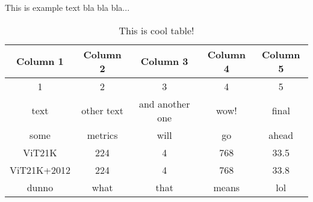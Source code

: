 \documentclass{article}
\begin{document}
This is example text bla bla bla...
\begin{table}[t]
\centering
\begin{tabular}{c c c c c}
\toprule
Column 1&Column 2&Column 3&Column 4&Column 5 \\
\midrule
1&2&3&4&5 \\
text&other text&and another one&wow!&final \\
some&metrics&will&go&ahead \\
ViT21K&224&4&768&33.5 \\
ViT21K+2012&224&4&768&33.8 \\
dunno&what&that&means&lol \\
\hline
\end{tabular}
\caption{This is cool table!}
\end{table}
\end{document}
